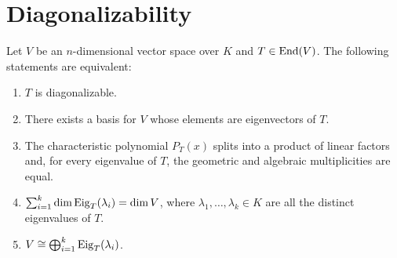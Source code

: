 \renewcommand{\thetheorem}{21.c.\arabic{theorem}}
\setcounter{theorem}{0}
\section{Diagonalizability}

\begin{theorem}\label{thm:diag_equiv}
  Let $V$ be an $n$-dimensional vector space over $K$ and $T \in \operatorname{End}(V)$. The following statements are equivalent:
  \begin{enumerate}[label=\textbf{(\alph*)}]
    \item $T$ is diagonalizable.
    \item There exists a basis for $V$ whose elements are eigenvectors of $T$.
    \item The characteristic polynomial $P_T(x)$ splits into a product of linear factors and, for every eigenvalue of $T$, the geometric and algebraic multiplicities are equal.
    \item $\sum_{i=1}^k \dim \operatorname{Eig}_T(\lambda_i) = \dim V$, where $\lambda_1, \dots, \lambda_k \in K$ are all the distinct eigenvalues of $T$.
    \item $V \cong \bigoplus_{i=1}^k \operatorname{Eig}_T(\lambda_i)$.
  \end{enumerate}
\end{theorem}

